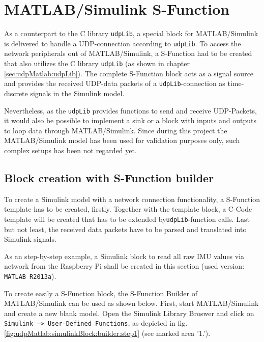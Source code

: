 \section{MATLAB/Simulink S-Function}
\label{sec:udpMatlab:simulinkBlock}

As a counterpart to the C library \texttt{udpLib}, a special block for MATLAB/Simulink is delivered to handle a UDP-connection according to \texttt{udpLib}. To access the network peripherals out of MATLAB/Simulink, a S-Function had to be created that also utilizes the C library \texttt{udpLib} (as shown in chapter \ref{sec:udpMatlab:udpLib}). The complete S-Function block acts as a signal source and provides the received UDP-data packets of a \texttt{udpLib}-connection as time-discrete signals in the Simulink model.

Nevertheless, as the \texttt{udpLib} provides functions to send and receive UDP-Packets, it would also be possible to implement a sink or a block with inputs and outputs to loop data through MATLAB/Simulink. Since during this project the MATLAB/Simulink model has been used for validation purposes only, such complex setups has been not regarded yet.

\subsection{Block creation with S-Function builder}
\label{sec:udpMatlab:simulinkBlock:builder}

To create a Simulink model with a network connection functionality, a S-Function template has to be created, firstly. Together with the template block, a C-Code template will be created that has to be extended by\texttt{udpLib}-function calls. Last but not least, the received data packets have to be parsed and translated into Simulink signals.

As an step-by-step example, a Simulink block to read all raw IMU values via network from the Raspberry Pi shall be created in this section (used version: \texttt{MATLAB R2013a}).

To create easily a S-Function block, the S-Function Builder of MATLAB/Simulink can be used as shown below. First, start MATLAB/Simulink and create a new blank model. Open the Simulink Library Broswer and click on \texttt{Simulink --> User-Defined Functions}, as depicted in fig. \ref{fig:udpMatlab:simulinkBlock:builder:step1} (see marked area '1.').

